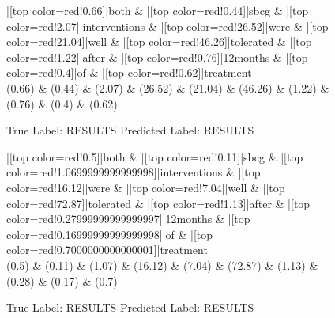 \documentclass[a4paper, landscape]{article}
\begin{document}
\begin{figure}
\begin{center}
\begin{dependency}
\begin{deptext}
|[top color=red!0.66]|both \& |[top color=red!0.44]|sbcg \& |[top color=red!2.07]|interventions \& |[top color=red!26.52]|were \& |[top color=red!21.04]|well \& |[top color=red!46.26]|tolerated \& |[top color=red!1.22]|after \& |[top color=red!0.76]|12months \& |[top color=red!0.4]|of \& |[top color=red!0.62]|treatment\\
(0.66) \& (0.44) \& (2.07) \& (26.52) \& (21.04) \& (46.26) \& (1.22) \& (0.76) \& (0.4) \& (0.62)\\
\end{deptext}
\end{dependency}
\end{center}
\caption{True Label: RESULTS Predicted Label: RESULTS}
\end{figure}
\clearpage
\begin{figure}
\begin{center}
\begin{dependency}
\begin{deptext}
|[top color=red!0.5]|both \& |[top color=red!0.11]|sbcg \& |[top color=red!1.0699999999999998]|interventions \& |[top color=red!16.12]|were \& |[top color=red!7.04]|well \& |[top color=red!72.87]|tolerated \& |[top color=red!1.13]|after \& |[top color=red!0.27999999999999997]|12months \& |[top color=red!0.16999999999999998]|of \& |[top color=red!0.7000000000000001]|treatment\\
(0.5) \& (0.11) \& (1.07) \& (16.12) \& (7.04) \& (72.87) \& (1.13) \& (0.28) \& (0.17) \& (0.7)\\
\end{deptext}
\end{dependency}
\end{center}
\caption{True Label: RESULTS Predicted Label: RESULTS}
\end{figure}
\end{document}
